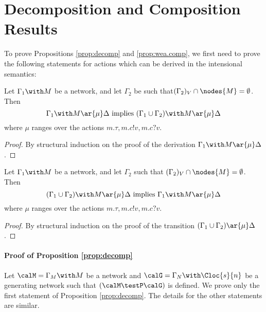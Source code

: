 \documentclass{LMCS}
\begin{document}
\section{Decomposition and Composition Results}
\label{sec:decomposition.results}
To prove Propositions \ref{prop:decomp} and \ref{prop:wea.comp}, 
we first need to prove the following statements for actions which 
can be derived in the intensional semantics: 
\begin{prop}[Weakening]
\label{prop:weakening}

Let $\Gamma_1 \with M$ be a network, and let $\Gamma_2$ be such 
that$(\Gamma_2)_V \cap \nodes{M} = \emptyset$.
Then 
\[
\Gamma_1 \with M \ar{\mu} \Delta \mbox{ implies } 
(\Gamma_1 \cup \Gamma_2) \with M \ar{\mu} \Delta
\]
\noindent
where $\mu$ ranges over the actions $m.\tau, m.c!v, m.c?v$.
\end{prop}
\begin{proof}
By structural induction on the proof of the derivation 
$\Gamma_1 \with M \ar{\mu} \Delta$.
\end{proof}

\begin{prop}[Strengthening]
\label{prop:strengthening}
Let $\Gamma_1 \with M$ be a network, and let $\Gamma_2$ such 
that $(\Gamma_2)_V \cap \nodes{M} = \emptyset$.
Then 
\[
(\Gamma_1 \cup \Gamma_2) \with M \ar{\mu} \Delta \mbox{ implies }
\Gamma_1 \with M \ar{\mu} \Delta 
\]
\noindent
where $\mu$ ranges over the actions $m.\tau, m.c!v, m.c?v$.
\end{prop}

\begin{proof}
By structural induction on the proof of the transition 
$(\Gamma_1 \cup \Gamma_2) \ar{\mu} \Delta$.
\end{proof}

\paragraph{\textbf{Proof of Proposition \ref{prop:decomp}}}
\label{proof:decomp}
Let $\calM = \Gamma_M \with M$ be a network and $\calG = \Gamma_N \with \Cloc{s}{n}$ be 
a generating network such that $(\calM \testP \calG)$ is defined. 
We prove only the first statement of Proposition \ref{prop:decomp}.  
The details for the other statements are similar. 
\end{document}
